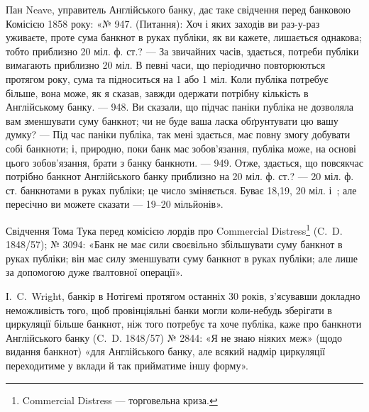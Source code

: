 
Пан Neave, управитель Англійського банку, дає таке свідчення перед
банковою Комісією 1858 року: «№ 947. (Питання): Хоч і яких заходів ви
раз-у-раз уживаєте, проте сума банкнот в руках публіки, як ви кажете,
лишається однакова; тобто приблизно 20 міл. ф. ст.? — За звичайних часів,
здається, потреби публіки вимагають приблизно 20 міл. В певні часи, що періодично
повторюються протягом року, сума та підноситься на 1 або 1 міл.
Коли публіка потребує більше, вона може, як я сказав, завжди одержати
потрібну кількість в Англійському банку. — 948. Ви сказали, що підчас паніки
публіка не дозволяла вам зменшувати суму банкнот; чи не буде ваша ласка
обґрунтувати цю вашу думку? — Під час паніки публіка, так мені здається, має
повну змогу добувати собі банкноти; і, природно, поки банк має зобов’язання,
публіка може, на основі цього зобов’язання, брати з банку банкноти. — 949.
Отже, здається, що повсякчас потрібно банкнот Англійського банку приблизно
на 20 міл. ф. ст.? — 20 міл. ф. ст. банкнотами в руках публіки; це число
зміняється. Буває 18,19, 20 міл. і~; але пересічно ви можете сказати —
19--20 мільйонів».

Свідчення Тома Тука перед комісією лордів про Commercial Distress\footnote*{
Commercial Distress — торговельна криза. 
}
(C.~D. 1848/57); № 3094: «Банк не має сили своєвільно збільшувати суму
банкнот в руках публіки; він має силу зменшувати суму банкнот в руках
публіки; але лише за допомогою дуже ґвалтовної операції».

І.~C.~Wright, банкір в Нотігемі протягом останніх 30 років, з’ясувавши
докладно неможливість того, щоб провінціяльні банки могли коли-небудь зберігати
в циркуляції більше банкнот, ніж того потребує та хоче публіка, каже про банкноти
Англійського банку (C.~D. 1848/57) № 2844: «Я не знаю ніяких меж»
(щодо видання банкнот) «для Англійського банку, але всякий надмір циркуляції
переходитиме у вклади й так прийматиме іншу форму».


